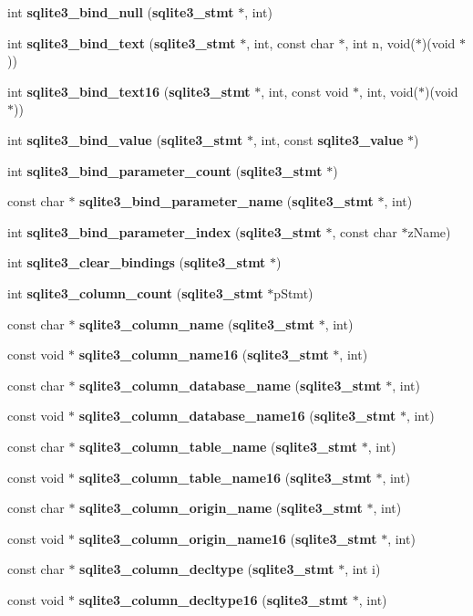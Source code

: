 \begin{DoxyCompactItemize}
int {\bf sqlite3\_\-bind\_\-null} ({\bf sqlite3\_\-stmt} $\ast$, int)
\item 
int {\bf sqlite3\_\-bind\_\-text} ({\bf sqlite3\_\-stmt} $\ast$, int, const char $\ast$, int n, void($\ast$)(void $\ast$))
\item 
int {\bf sqlite3\_\-bind\_\-text16} ({\bf sqlite3\_\-stmt} $\ast$, int, const void $\ast$, int, void($\ast$)(void $\ast$))
\item 
int {\bf sqlite3\_\-bind\_\-value} ({\bf sqlite3\_\-stmt} $\ast$, int, const {\bf sqlite3\_\-value} $\ast$)
\item 
int {\bf sqlite3\_\-bind\_\-parameter\_\-count} ({\bf sqlite3\_\-stmt} $\ast$)
\item 
const char $\ast$ {\bf sqlite3\_\-bind\_\-parameter\_\-name} ({\bf sqlite3\_\-stmt} $\ast$, int)
\item 
int {\bf sqlite3\_\-bind\_\-parameter\_\-index} ({\bf sqlite3\_\-stmt} $\ast$, const char $\ast$zName)
\item 
int {\bf sqlite3\_\-clear\_\-bindings} ({\bf sqlite3\_\-stmt} $\ast$)
\item 
int {\bf sqlite3\_\-column\_\-count} ({\bf sqlite3\_\-stmt} $\ast$pStmt)
\item 
const char $\ast$ {\bf sqlite3\_\-column\_\-name} ({\bf sqlite3\_\-stmt} $\ast$, int)
\item 
const void $\ast$ {\bf sqlite3\_\-column\_\-name16} ({\bf sqlite3\_\-stmt} $\ast$, int)
\item 
const char $\ast$ {\bf sqlite3\_\-column\_\-database\_\-name} ({\bf sqlite3\_\-stmt} $\ast$, int)
\item 
const void $\ast$ {\bf sqlite3\_\-column\_\-database\_\-name16} ({\bf sqlite3\_\-stmt} $\ast$, int)
\item 
const char $\ast$ {\bf sqlite3\_\-column\_\-table\_\-name} ({\bf sqlite3\_\-stmt} $\ast$, int)
\item 
const void $\ast$ {\bf sqlite3\_\-column\_\-table\_\-name16} ({\bf sqlite3\_\-stmt} $\ast$, int)
\item 
const char $\ast$ {\bf sqlite3\_\-column\_\-origin\_\-name} ({\bf sqlite3\_\-stmt} $\ast$, int)
\item 
const void $\ast$ {\bf sqlite3\_\-column\_\-origin\_\-name16} ({\bf sqlite3\_\-stmt} $\ast$, int)
\item 
const char $\ast$ {\bf sqlite3\_\-column\_\-decltype} ({\bf sqlite3\_\-stmt} $\ast$, int i)
\item 
const void $\ast$ {\bf sqlite3\_\-column\_\-decltype16} ({\bf sqlite3\_\-stmt} $\ast$, int)

\end{DoxyCompactItemize}
